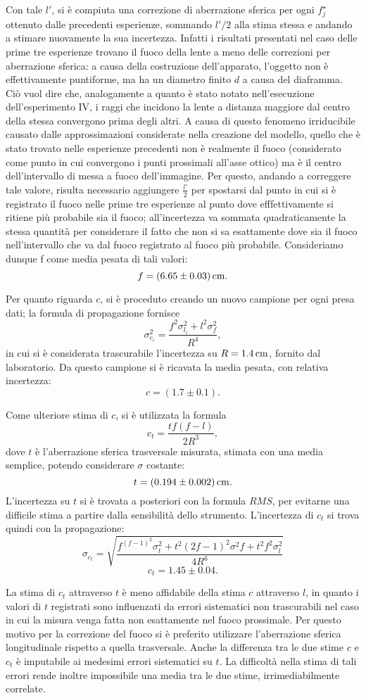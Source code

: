 Con tale $l'$, si \`e compiuta una correzione di aberrazione sferica per ogni $f^{\star}_j$ ottenuto dalle precedenti esperienze, sommando $l'/2$ alla stima stessa e andando a stimare nuovamente la sua incertezza. Infatti i risultati presentati nel caso delle prime tre esperienze trovano il fuoco della lente a meno delle correzioni per aberrazione sferica: a causa della costruzione dell'apparato, l'oggetto non è effettivamente puntiforme, ma ha un diametro finito $d$ a causa del diaframma. Ciò vuol dire che, analogamente a quanto è stato notato nell'esecuzione dell'esperimento IV, i raggi che incidono la lente a distanza maggiore dal centro della stessa convergono prima degli altri. A causa di questo fenomeno irriducibile causato dalle approssimazioni considerate nella creazione del modello, quello che è stato trovato nelle esperienze precedenti non è realmente il fuoco (considerato come punto in cui convergono i punti prossimali all'asse ottico) ma è il centro dell'intervallo di messa a fuoco dell'immagine. Per questo, andando a correggere tale valore, risulta necessario aggiungere $\frac{l'}{2}$ per spostarsi dal punto in cui si \`e registrato il fuoco nelle prime tre esperienze al punto dove efffettivamente si ritiene più probabile sia il fuoco; all'incertezza va sommata quadraticamente la stessa quantità per considerare il fatto che non si sa esattamente dove sia il fuoco nell'intervallo che va dal fuoco registrato al fuoco pi\`u probabile. Consideriamo dunque f come media pesata di tali valori:
\[ f = (6.65 \pm 0.03) \,\mathrm{cm}. \] 


Per quanto riguarda $c$, si \`e proceduto creando un nuovo campione per ogni presa dati; la formula di propagazione fornisce 
\[  \sigma^2_{c_i} =\frac{f^2    \sigma^2_{l_i} + l^2    \sigma^2_{f}}{R^4}, \]
in cui si \`e considerata trascurabile l'incertezza su $R=1.4\,\mathrm{cm}$, fornito dal laboratorio.
Da questo campione si \`e ricavata la media pesata, con relativa incertezza:
\[ c = (1.7 \pm 0.1). \] 



Come ulteriore stima di $c$, si \`e utilizzata la formula
\[ c_t = \frac{t   f   (f-l)}{2R^3}, \]
dove $t$ \`e l'aberrazione sferica trasversale misurata, stimata con una media semplice, potendo considerare $\sigma$ costante:
\[ t = (0.194 \pm 0.002) \,\mathrm{cm}.\]
L'incertezza su $t$ si \`e trovata a posteriori con la formula $RMS$, per evitarne una difficile stima a partire dalla sensibilit\`a dello strumento. 
L'incertezza di $c_t$ si trova quindi con la propagazione: 
\[ \sigma_{c_t} = \sqrt{ \frac
{ f^   (f-1)^2    \sigma^2_{t}  +  t^2   (2f-1)^2    \sigma^2{f}  +  t^2   f^2    \sigma^2_{l}}
{4R^6}
}   \]
\[c_t = 1.45 \pm 0.04. \]


La stima di $c_t$ attraverso $t$ \`e meno affidabile della stima $c$ attraverso $l$, in quanto i valori di $t$ registrati sono influenzati da errori sistematici non trascurabili nel caso in cui la misura venga fatta non esattamente nel fuoco prossimale. Per questo motivo per la correzione del fuoco si \`e preferito utilizzare l'aberrazione sferica longitudinale rispetto a quella trasversale.
Anche la differenza tra le due stime $c$ e $c_t$ \`e imputabile ai medesimi errori sistematici su $t$. La difficolt\`a nella stima di tali errori rende inoltre impossibile una media tra le due stime, irrimediabilmente correlate.

